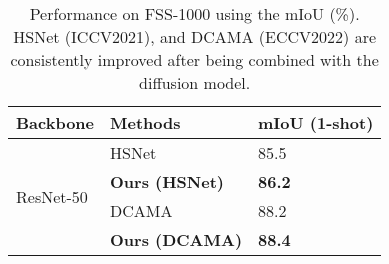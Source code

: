 \documentclass[sigconf]{acmart}
\begin{document}
\begin{table}[tb]
\caption{Performance on FSS-1000 using the mIoU (\%). HSNet (ICCV2021), and DCAMA (ECCV2022) are consistently improved after being combined with the diffusion model.}
\label{table_FS1000}
\begin{tabular}{lll}
\toprule
Backbone                   & Methods               & mIoU (1-shot)  \\
\midrule 
\multirow{4}{*}{ResNet-50} & HSNet \cite{HSNet2021}                 & 85.5          \\
                       &  \textbf{Ours (HSNet)} & \textbf{86.2} \\
                           & DCAMA \cite{DCAMA2022}                 & 88.2          \\
                      & \textbf{Ours (DCAMA)} & \textbf{88.4} \\ \bottomrule
\end{tabular}
\end{table}




\begin{table}[tb]
\centering
\caption{Performance on MiniCOCO- using mIoU (\%). BAM (CVPR2022) and HDMNet (CVPR2023) are consistently improved after being combined with the diffusion model.}
\label{table_minicoco}
\end{table}
\end{document}
